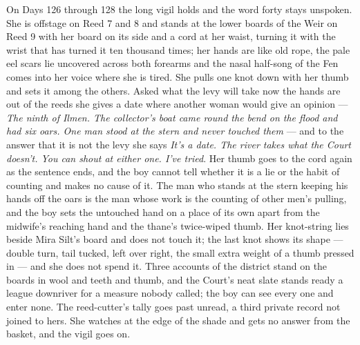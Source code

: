 \documentclass{design/chronicle}
\begin{document}
{On Days 126 through 128 the long vigil holds and the word forty stays unspoken. She is offstage on Reed 7 and 8 and stands at the lower boards of the Weir on Reed 9 with her board on its side and a cord at her waist, turning it with the wrist that has turned it ten thousand times; her hands are like old rope, the pale eel scars lie uncovered across both forearms and the nasal half-song of the Fen comes into her voice where she is tired. She pulls one knot down with her thumb and sets it among the others. Asked what the levy will take now the hands are out of the reeds she gives a date where another woman would give an opinion — \emph{The ninth of Ilmen. The collector’s boat came round the bend on the flood and had six oars. One man stood at the stern and never touched them} — and to the answer that it is not the levy she says \emph{It’s a date. The river takes what the Court doesn’t. You can shout at either one. I’ve tried}. Her thumb goes to the cord again as the sentence ends, and the boy cannot tell whether it is a lie or the habit of counting and makes no cause of it. The man who stands at the stern keeping his hands off the oars is the man whose work is the counting of other men’s pulling, and the boy sets the untouched hand on a place of its own apart from the midwife’s reaching hand and the thane’s twice-wiped thumb. Her knot-string lies beside Mira Silt’s board and does not touch it; the last knot shows its shape — double turn, tail tucked, left over right, the small extra weight of a thumb pressed in — and she does not spend it. Three accounts of the district stand on the boards in wool and teeth and thumb, and the Court’s neat slate stands ready a league downriver for a measure nobody called; the boy can see every one and enter none. The reed-cutter’s tally goes past unread, a third private record not joined to hers. She watches at the edge of the shade and gets no answer from the basket, and the vigil goes on.

\begin{itemize}[leftmargin=1.4em,itemsep=1pt,topsep=3pt,parsep=0pt]


\end{itemize}}
\end{document}
